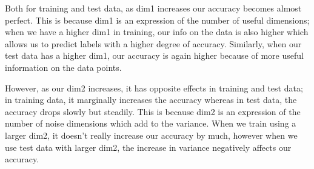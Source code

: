 \documentclass[12pt]{article}
\newcounter{ques}
\newenvironment{question}{\stepcounter{ques}{\noindent\bf Question \arabic{ques}:}}{\vspace{5mm}}
\begin{document}
\begin{question}
Both for training and test data, as dim1 increases our accuracy becomes almost perfect. This is because dim1 is an expression of the number of useful dimensions; when we have a higher dim1 in training, our info on the data is also higher which allows us to predict labels with a higher degree of accuracy. Similarly, when our test data has a higher dim1, our accuracy is again higher because of more useful information on the data points.

However, as our dim2 increases, it has opposite effects in training and test data; in training data, it marginally increases the accuracy whereas in test data, the accuracy drops slowly but steadily. This is because dim2 is an expression of the number of noise dimensions which add to the variance. When we train using a larger dim2, it doesn't really increase our accuracy by much, however when we use test data with larger dim2, the increase in variance negatively affects our accuracy.



\end{question}
\end{document}
